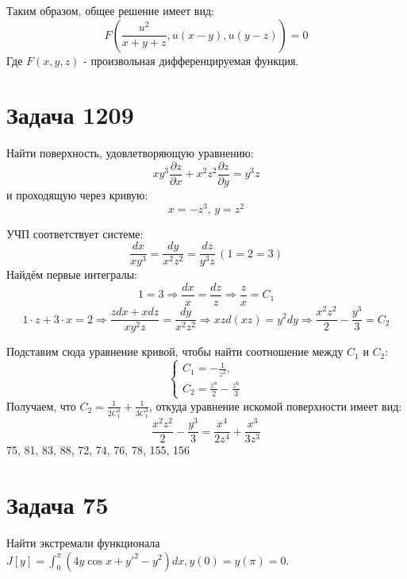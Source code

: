 \documentclass[11pt]{article}
\begin{document}
Таким образом, общее решение имеет вид:
$$F\left(\frac{u^2}{x + y + z}, u(x - y), u(y - z)\right) = 0$$
Где \(F(x, y, z)\) - произвольная дифференцируемая функция.

\section{Задача 1209}
\label{sec:org0210358}
Найти поверхность, удовлетворяющую уравнению:
$$xy^3\frac{\partial{z}}{\partial{x}} + x^2z^2\frac{\partial{z}}{\partial{y}} = y^3z$$
и проходящую через кривую:
$$x = -z^3, \, y = z^2$$

УЧП соответствует системе:
$$\frac{dx}{xy^3} = \frac{dy}{x^2z^2} = \frac{dz}{y^3z} \, (1 = 2 = 3)$$
Найдём первые интегралы:
$$1 = 3 \Rightarrow \frac{dx}{x} = \frac{dz}{z} \Rightarrow \frac{z}{x} = C_1$$
$$1 \cdot z + 3 \cdot x = 2 \Rightarrow \frac{zdx + xdz}{xy^2z} = \frac{dy}{x^2z^2} \Rightarrow xzd(xz) = y^2dy \Rightarrow \frac{x^2z^2}{2} - \frac{y^3}{3} = C_2$$

Подставим сюда уравнение кривой, чтобы найти соотношение между \(C_1\) и \(C_2\):
\begin{equation*}
  \begin{cases}
    C_1 = -\frac{1}{z^2},\\
    C_2 = \frac{z^8}{2} - \frac{z^6}{3}
  \end{cases}
\end{equation*}
Получаем, что \(C_2 = \frac{1}{2C_1^4} + \frac{1}{3C_1^3}\), откуда уравнение искомой поверхности имеет вид:
$$\frac{x^2z^2}{2} - \frac{y^3}{3} = \frac{x^4}{2z^4} + \frac{x^3}{3z^3}$$
75, 81, 83, 88, 72, 74, 76, 78, 155, 156
\section{Задача 75}
\label{sec:orgc533e08}
Найти экстремали функционала \(J[y] = \int_0^\pi(4y\cos x + y'^2 - y^2)dx, y(0) = y(\pi) = 0\).
\end{document}
